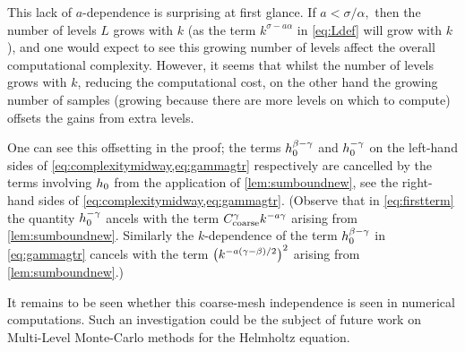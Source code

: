 This lack of $a$-dependence is surprising at first glance. If $a < \sigma/\alpha,$ then the number of levels $L$ grows with $k$ (as the term $k^{\sigma - a\alpha}$ in \cref{eq:Ldef} will grow with $k$), and one would expect to see this growing number of levels affect the overall computational complexity. However, it seems that whilst the number of levels grows with $k$, reducing the computational cost, on the other hand the growing number of samples (growing because there are more levels on which to compute) offsets the gains from extra levels.

One can see this offsetting in the proof; the terms $h_{0}^{\beta-\gamma}$ and $h_{0}^{-\gamma}$ on the left-hand sides of  \cref{eq:complexitymidway,eq:gammagtr} respectively are cancelled by the terms involving $h_{0}$ from the application of \cref{lem:sumboundnew}, see the right-hand sides of \cref{eq:complexitymidway,eq:gammagtr}. (Observe that in \cref{eq:firstterm} the quantity $h_{0}^{-\gamma}$ ancels with the term $C_{\mathrm{coarse}}^{\gamma}k^{-a\gamma}$ arising from \cref{lem:sumboundnew}. Similarly the $k$-dependence of the term $h_{0}^{\beta-\gamma}$ in \cref{eq:gammagtr} cancels with the term $\mleft(k^{-a(\gamma-\beta)/2}\mright)^2$ arising from \ref{lem:sumboundnew}.)

It remains to be seen whether this coarse-mesh independence is seen in numerical computations. Such an investigation could be the subject of future work on Multi-Level Monte-Carlo methods for the Helmholtz equation.
\ere
{}
